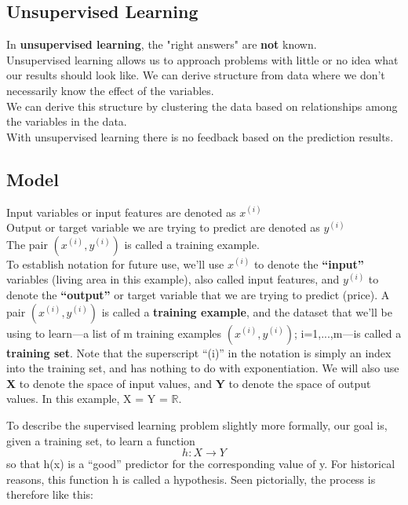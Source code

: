 \subsection{Unsupervised Learning}

In \textbf{unsupervised learning}, the "right answers" are \textbf{not} known.\\



Unsupervised learning allows us to approach problems with little or no idea what our results should look like. We can derive structure from data where we don't necessarily know the effect of the variables.\\

We can derive this structure by clustering the data based on relationships among the variables in the data.\\

With unsupervised learning there is no feedback based on the prediction results. \\

\subsection{Model}

Input variables or input features are denoted as $x^{(i)}$\\
Output or target variable we are trying to predict are denoted as $y^{(i)}$\\
The pair $(x^{(i)}, y^{(i)})$ is called a training example.\\

To establish notation for future use, we’ll use $x^{(i)}$ to denote the \textbf{“input”} variables (living area in this example), also called input features, and $y^{(i)}$ to denote the \textbf{“output”} or target variable that we are trying to predict (price). A pair $(x^{(i)}, y^{(i)})$ is called a \textbf{training example}, and the dataset that we’ll be using to learn—a list of m training examples $(x^{(i)}, y^{(i)})$; i=1,...,m—is called a \textbf{training set}. Note that the superscript “(i)” in the notation is simply an index into the training set, and has nothing to do with exponentiation. We will also use \textbf{X} to denote the space of input values, and \textbf{Y} to denote the space of output values. In this example, X = Y = $\mathbb{R}$.

To describe the supervised learning problem slightly more formally, our goal is, given a training set, to learn a function
\begin{equation}
  h : X \rightarrow Y
\end{equation}
so that h(x) is a “good” predictor for the corresponding value of y. For historical reasons, this function h is called a hypothesis. Seen pictorially, the process is therefore like this:

